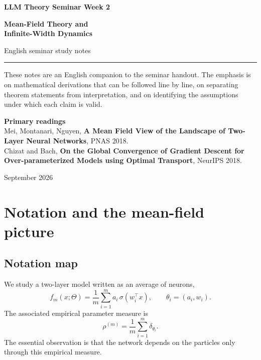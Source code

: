 \documentclass[11pt,a4paper,oneside,openany]{memoir}
\theoremstyle{definition}
\begin{document}
\begin{titlingpage}
\thispagestyle{empty}
\vspace*{1.2cm}
{\small\bfseries LLM Theory Seminar \hfill Week 2\par}
\vspace{1.4cm}
{\HUGE\bfseries Mean-Field Theory and\\[0.18em]Infinite-Width Dynamics\par}
\vspace{0.55cm}
{\large English seminar study notes\par}
\vspace{0.9cm}
\rule{\textwidth}{0.7pt}
\vspace{1.1cm}
\begin{minipage}{0.86\textwidth}
\small
These notes are an English companion to the seminar handout.  The emphasis is on
mathematical derivations that can be followed line by line, on separating theorem
statements from interpretation, and on identifying the assumptions under which each
claim is valid.
\end{minipage}
\vfill
{\small\textbf{Primary readings}\\[0.25em]
Mei, Montanari, Nguyen, \textbf{A Mean Field View of the Landscape of Two-Layer Neural Networks}, PNAS 2018.\\Chizat and Bach, \textbf{On the Global Convergence of Gradient Descent for Over-parameterized Models using Optimal Transport}, NeurIPS 2018.
\par}
\vspace{0.8cm}
{\small September 2026\par}
\end{titlingpage}
\tableofcontents*
\clearpage

\chapter{Notation and the mean-field picture}
\section{Notation map}
We study a two-layer model written as an average of neurons,
\[
f_m(x;\Theta)=\frac1m\sum_{i=1}^m a_i\,\sigma(w_i^\top x),
\qquad \theta_i=(a_i,w_i).
\]
The associated empirical parameter measure is
\[
\rho^{(m)}=\frac1m\sum_{i=1}^m\delta_{\theta_i}.
\]
The essential observation is that the network depends on the particles only through this empirical measure.
\end{document}

